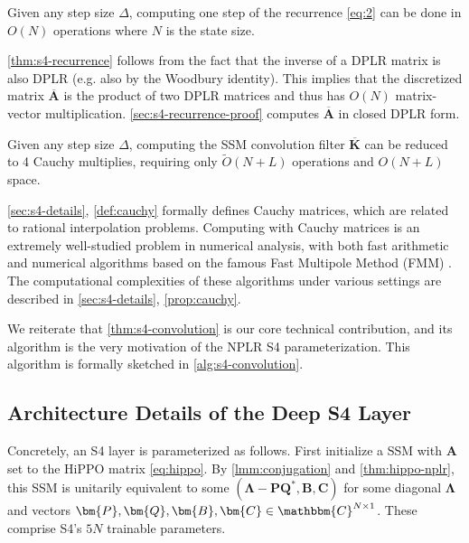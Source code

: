 \begin{theorem}[S4 Recurrence]
  \label{thm:s4-recurrence}
  Given any step size \( \Delta \), computing one step of the recurrence \eqref{eq:2} can be done in \( O(N) \) operations where \( N \) is the state size.
\end{theorem}

\ref{thm:s4-recurrence} follows from the fact that the inverse of a DPLR matrix is also DPLR (e.g. also by the Woodbury identity). This implies that the discretized matrix \( \bm{\overline{A}} \) is the product of two DPLR matrices and thus has \( O(N) \) matrix-vector multiplication.
\ref{sec:s4-recurrence-proof} computes \( \bm{\overline{A}} \) in closed DPLR form.

\begin{theorem}[S4 Convolution]
  \label{thm:s4-convolution}
  Given any step size \( \Delta \), computing the SSM convolution filter \( \bm{\overline{K}} \) can be reduced to 4 Cauchy multiplies, requiring only
  \( \widetilde{O}(N+L) \) operations and \( O(N+L) \) space.
\end{theorem}

\ref{sec:s4-details}, \ref{def:cauchy} formally defines Cauchy matrices, which are related to rational interpolation problems. Computing with Cauchy matrices is an extremely well-studied problem in numerical analysis, with both fast arithmetic and numerical algorithms based on the famous Fast Multipole Method (FMM) \citep{pan2001structured,pan2015transformations,pan2017fast}. The computational complexities of these algorithms under various settings are described in \ref{sec:s4-details}, \ref{prop:cauchy}.

We reiterate that \ref{thm:s4-convolution} is our core technical contribution, and its algorithm is the very motivation of the NPLR S4 parameterization. This algorithm is formally sketched in \ref{alg:s4-convolution}.

\subsection{Architecture Details of the Deep S4 Layer}
\label{sec:s4-architecture}

Concretely, an S4 layer is parameterized as follows. First initialize a SSM with \( \bm{A} \) set to the HiPPO matrix \eqref{eq:hippo}.
By \ref{lmm:conjugation} and \ref{thm:hippo-nplr},
this SSM is unitarily equivalent to some \( (\bm{\Lambda} - \bm{P}\bm{Q}^*, \bm{B}, \bm{C}) \) for some diagonal \( \bm{\Lambda} \) and vectors \( \bm{P}, \bm{Q}, \bm{B}, \bm{C} \in \mathbbm{C}^{N \times 1} \).
These comprise S4's \( 5N \) trainable parameters.

